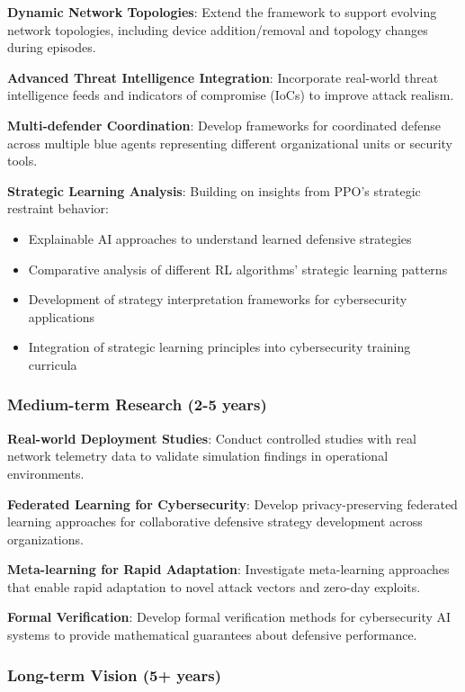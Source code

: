\documentclass[12pt,twoside]{article}
\theoremstyle{definition}
\theoremstyle{plain}
\begin{document}
\textbf{Dynamic Network Topologies}: Extend the framework to support evolving network topologies, including device addition/removal and topology changes during episodes.

\textbf{Advanced Threat Intelligence Integration}: Incorporate real-world threat intelligence feeds and indicators of compromise (IoCs) to improve attack realism.

\textbf{Multi-defender Coordination}: Develop frameworks for coordinated defense across multiple blue agents representing different organizational units or security tools.

\textbf{Strategic Learning Analysis}: Building on insights from PPO's strategic restraint behavior:
\begin{itemize}
\item Explainable AI approaches to understand learned defensive strategies
\item Comparative analysis of different RL algorithms' strategic learning patterns
\item Development of strategy interpretation frameworks for cybersecurity applications
\item Integration of strategic learning principles into cybersecurity training curricula
\end{itemize}

\subsubsection{Medium-term Research (2-5 years)}

\textbf{Real-world Deployment Studies}: Conduct controlled studies with real network telemetry data to validate simulation findings in operational environments.

\textbf{Federated Learning for Cybersecurity}: Develop privacy-preserving federated learning approaches for collaborative defensive strategy development across organizations.

\textbf{Meta-learning for Rapid Adaptation}: Investigate meta-learning approaches that enable rapid adaptation to novel attack vectors and zero-day exploits.

\textbf{Formal Verification}: Develop formal verification methods for cybersecurity AI systems to provide mathematical guarantees about defensive performance.

\subsubsection{Long-term Vision (5+ years)}
\end{document}
